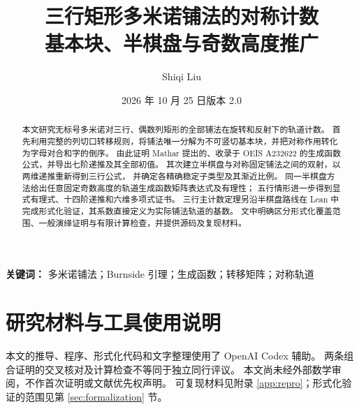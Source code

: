 \documentclass[UTF8,a4paper,11pt,fontset=fandol]{ctexart}
\title{\bfseries 三行矩形多米诺铺法的对称计数\\[4pt]
\large 基本块、半棋盘与奇数高度推广}
\author{Shiqi Liu}
\date{2026 年 10 月 25 日\quad 版本 2.0}
\theoremstyle{definition}
\theoremstyle{remark}
\numberwithin{equation}{section}
\begin{document}
\maketitle
\begin{abstract}
本文研究无标号多米诺对三行、偶数列矩形的全部铺法在旋转和反射下的轨道计数。
首先利用完整的列切口转移规则，将铺法唯一分解为不可竖切基本块，并把对称作用转化为字母对合和字的倒序。
由此证明 Mathar 提出的、收录于 OEIS A232622 的生成函数公式，并导出七阶递推及其全部初值。
其次建立半棋盘与对称固定铺法之间的双射，以两维递推重新得到三行公式，
并确定各精确稳定子类型及其渐近比例。
同一半棋盘方法给出任意固定奇数高度的轨道生成函数矩阵表达式及有理性；
五行情形进一步得到显式有理式、十四阶递推和六维多项式证书。
三行主计数定理另沿半棋盘路线在 Lean 中完成形式化验证，其系数直接定义为实际铺法轨道的基数。
文中明确区分形式化覆盖范围、一般演绎证明与有限计算检查，并提供源码及复现材料。
\end{abstract}
\noindent\textbf{关键词：} 多米诺铺法；Burnside 引理；生成函数；转移矩阵；对称轨道









\section*{研究材料与工具使用说明}
本文的推导、程序、形式化代码和文字整理使用了 OpenAI Codex 辅助。
两条组合证明的交叉核对及计算检查不等同于独立同行评议。
本文尚未经外部数学审阅，不作首次证明或文献优先权声明。
可复现材料见附录 \ref{app:repro}；形式化验证的范围见第 \ref{sec:formalization} 节。
\appendix


\clearpage

\end{document}
